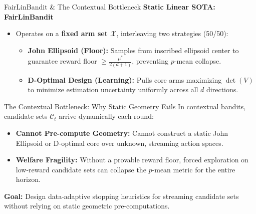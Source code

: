 \documentclass[11pt]{beamer}
\begin{document}
\begin{frame}{FairLinBandit \& The Contextual Bottleneck}
  \small
  \textbf{Static Linear SOTA: FairLinBandit \cite{sarkar2026}}
  \begin{itemize}
    \item Operates on a \textbf{fixed arm set $\mathcal{X}$}, interleaving two strategies (50/50):
    \begin{itemize}\footnotesize
      \item \textbf{John Ellipsoid (Floor):} Samples from inscribed ellipsoid center to guarantee reward floor $\ge \frac{\mu^*}{2(d+1)}$, preventing $p$-mean collapse.
      \item \textbf{D-Optimal Design (Learning):} Pulls core arms maximizing $\det(V)$ to minimize estimation uncertainty uniformly across all $d$ directions.
    \end{itemize}
  \end{itemize}

  \vspace{4pt}
  \begin{alertblock}{The Contextual Bottleneck: Why Static Geometry Fails}
    \footnotesize
    In contextual bandits, candidate sets $\mathcal{C}_t$ arrive dynamically each round:
    \begin{itemize}
      \item \textbf{Cannot Pre-compute Geometry:} Cannot construct a static John Ellipsoid or D-optimal core over unknown, streaming action spaces.
      \item \textbf{Welfare Fragility:} Without a provable reward floor, forced exploration on low-reward candidate sets can collapse the $p$-mean metric for the entire horizon.
    \end{itemize}
  \end{alertblock}

  \vspace{3pt}
  \raggedright\footnotesize
  \textbf{Goal:} Design data-adaptive stopping heuristics for streaming candidate sets without relying on static geometric pre-computations.
\end{frame}
\end{document}
